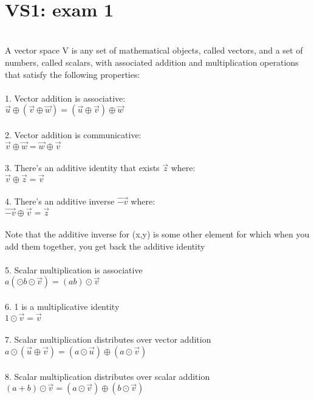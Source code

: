 \documentclass{article}
\begin{document}
\\
\tableofcontents
\newpage
\section{VS1: exam 1}\\

A vector space V is any set of mathematical objects, called vectors, and a set of numbers, called scalars, with associated addition and multiplication operations that satisfy the following properties:\\
\\
1. Vector addition is associative:\\
$\vec{u}\oplus(\vec{v}\oplus\vec{w}) = (\vec{u}\oplus\vec{v})\oplus\vec{w}$\\
\\
2. Vector addition is communicative:\\
$\vec{v}\oplus\vec{w} = \vec{w}\oplus\vec{v}$\\
\\
3. There's an additive identity that exists $\vec{z}$ where:\\
$\vec{v}\oplus\vec{z}=\vec{v}$\\
\\
4. There's an additive inverse $\vec{-v}$ where:\\
$\vec{-v}\oplus\vec{v}=\vec{z}$\\
\\
Note that the additive inverse for (x,y) is some other element for which when you add them together, you get back the additive identity \\
\\
5. Scalar multiplication is associative\\
${a}(\odot{b}\odot\vec{v}) = (ab)\odot\vec{v}$\\
\\
6. 1 is a multiplicative identity\\
${1}\odot\vec{v} = \vec{v}$\\
\\
7. Scalar multiplication distributes over vector addition\\
${a}\odot(\vec{u}\oplus\vec{v}) = ({a}\odot\vec{u})\oplus({a}\odot\vec{v})$\\
\\
8. Scalar multiplication distributes over scalar addition \\
$(a+b)\odot\vec{v} = (a\odot\vec{v})\oplus(b\odot\vec{v})$\\
\newpage
\end{document}

